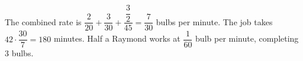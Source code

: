 The combined rate is $\dfrac{2}{20}+\dfrac{3}{30}+\dfrac{\dfrac{3}{2}}{45}=\dfrac{7}{30}$ bulbs per minute. The job takes $42\cdot\dfrac{30}{7}=180$ minutes. Half a Raymond works at $\dfrac{1}{60}$ bulb per minute, completing $\boxed3$ bulbs.
